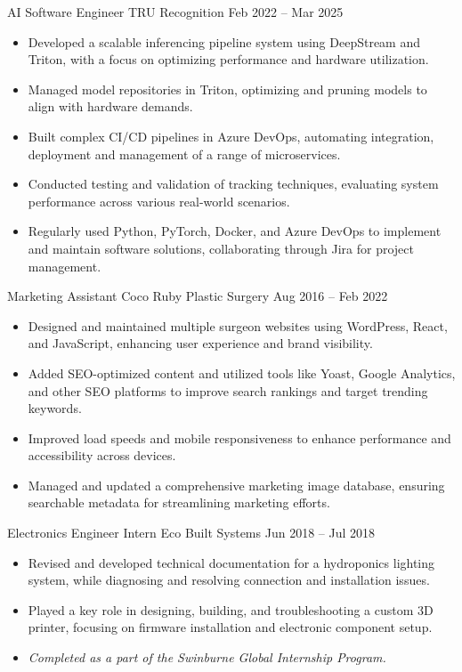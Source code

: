 \documentclass[9pt]{extarticle}
\begin{document}
\cvbreak

\begin{minipage}[t]{\textwidth}
	\vspace{-\baselineskip}

	\cvexperience
		{AI Software Engineer}
		{TRU Recognition}
		{Feb 2022 -- Mar 2025}
		{
			\begin{itemize}[itemsep=0.25em]
				\item Developed a scalable inferencing pipeline system using DeepStream and Triton, with a focus on optimizing performance and hardware utilization.
				\item Managed model repositories in Triton, optimizing and pruning models to align with hardware demands.
				\item Built complex CI/CD pipelines in Azure DevOps, automating integration, deployment and management of a range of microservices.
				\item Conducted testing and validation of tracking techniques, evaluating system performance across various real-world scenarios.
				\item Regularly used Python, PyTorch, Docker, and Azure DevOps to implement and maintain software solutions, collaborating through Jira for project management.
			\end{itemize}
		}

	\cvexperience
		{Marketing Assistant}
		{Coco Ruby Plastic Surgery}
		{Aug 2016 -- Feb 2022}
		{
			\begin{itemize}[itemsep=0.25em]
				\item Designed and maintained multiple surgeon websites using WordPress, React, and JavaScript, enhancing user experience and brand visibility.
				\item Added SEO-optimized content and utilized tools like Yoast, Google Analytics, and other SEO platforms to improve search rankings and target trending keywords.
				\item Improved load speeds and mobile responsiveness to enhance performance and accessibility across devices.
				\item Managed and updated a comprehensive marketing image database, ensuring searchable metadata for streamlining marketing efforts.
			\end{itemize}
		}

	\cvexperience
		{Electronics Engineer Intern}
		{Eco Built Systems}
		{Jun 2018 -- Jul 2018}
		{
			\begin{itemize}[itemsep=0.25em]
				\item Revised and developed technical documentation for a hydroponics lighting system, while diagnosing and resolving connection and installation issues.
				\item Played a key role in designing, building, and troubleshooting a custom 3D printer, focusing on firmware installation and electronic component setup.
				\item \textit{Completed as a part of the Swinburne Global Internship Program.}
			\end{itemize}
		}
\end{minipage}
\end{document}
